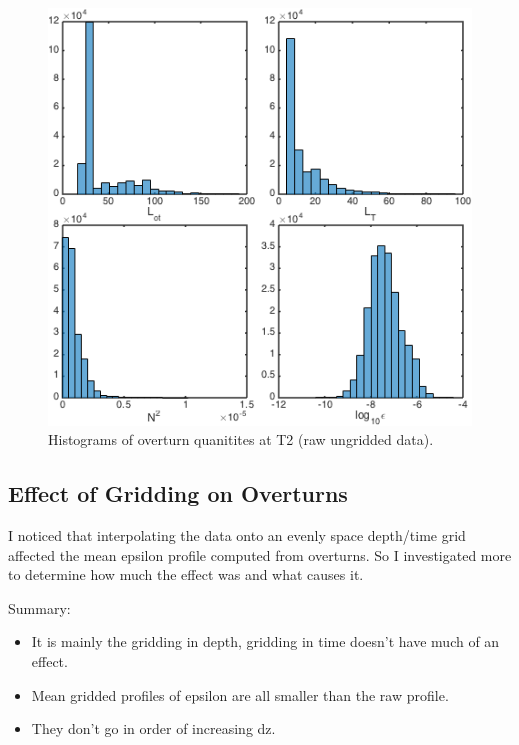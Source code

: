 \documentclass[11pt]{article}
\begin{document}
\begin{figure}[htbp]
\includegraphics[scale=0.8]{T2_OThist_raw.png}
\caption{Histograms of overturn quanitites at T2 (raw ungridded data).}
\label{}
\end{figure}



\clearpage

\subsection{Effect of Gridding on Overturns}

I noticed that interpolating the data onto an evenly space depth/time grid affected the mean epsilon profile computed from overturns. So I investigated more to determine how much the effect was and what causes it.

Summary:
\begin{itemize}
\item It is mainly the gridding in depth, gridding in time doesn't have much of an effect. \item Mean gridded profiles of epsilon are all smaller than the raw profile. 
\item They don't go in order of increasing dz.
\end{itemize}
\end{document}
